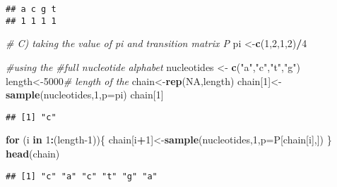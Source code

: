 \documentclass[
]{article}
\newenvironment{Shaded}{\begin{snugshade}}{\end{snugshade}}
\newcommand{\CommentTok}[1]{\textcolor[rgb]{0.56,0.35,0.01}{\textit{#1}}}
\newcommand{\ControlFlowTok}[1]{\textcolor[rgb]{0.13,0.29,0.53}{\textbf{#1}}}
\newcommand{\DataTypeTok}[1]{\textcolor[rgb]{0.13,0.29,0.53}{#1}}
\newcommand{\DecValTok}[1]{\textcolor[rgb]{0.00,0.00,0.81}{#1}}
\newcommand{\KeywordTok}[1]{\textcolor[rgb]{0.13,0.29,0.53}{\textbf{#1}}}
\newcommand{\NormalTok}[1]{#1}
\newcommand{\OperatorTok}[1]{\textcolor[rgb]{0.81,0.36,0.00}{\textbf{#1}}}
\newcommand{\OtherTok}[1]{\textcolor[rgb]{0.56,0.35,0.01}{#1}}
\newcommand{\StringTok}[1]{\textcolor[rgb]{0.31,0.60,0.02}{#1}}
\begin{document}
\begin{verbatim}
## a c g t 
## 1 1 1 1
\end{verbatim}

\begin{Shaded}
\begin{Highlighting}[]
\CommentTok{# C) taking the value of pi and transition matrix P }
\NormalTok{pi <-}\KeywordTok{c}\NormalTok{(}\DecValTok{1}\NormalTok{,}\DecValTok{2}\NormalTok{,}\DecValTok{1}\NormalTok{,}\DecValTok{2}\NormalTok{)}\OperatorTok{/}\DecValTok{4}

\CommentTok{#using the }
\CommentTok{#full nucleotide alphabet}
\NormalTok{nucleotides <-}\StringTok{ }\KeywordTok{c}\NormalTok{(}\StringTok{"a"}\NormalTok{,}\StringTok{"c"}\NormalTok{,}\StringTok{"t"}\NormalTok{,}\StringTok{"g"}\NormalTok{)}
\NormalTok{length<-}\DecValTok{5000}\CommentTok{# length of the}
\NormalTok{chain<-}\KeywordTok{rep}\NormalTok{(}\OtherTok{NA}\NormalTok{,length)}
\NormalTok{chain[}\DecValTok{1}\NormalTok{]<-}\KeywordTok{sample}\NormalTok{(nucleotides,}\DecValTok{1}\NormalTok{,}\DataTypeTok{p=}\NormalTok{pi)}
\NormalTok{chain[}\DecValTok{1}\NormalTok{]}
\end{Highlighting}
\end{Shaded}

\begin{verbatim}
## [1] "c"
\end{verbatim}

\begin{Shaded}
\begin{Highlighting}[]
\ControlFlowTok{for}\NormalTok{ (i }\ControlFlowTok{in} \DecValTok{1}\OperatorTok{:}\NormalTok{(length}\DecValTok{-1}\NormalTok{))\{ }
\NormalTok{ chain[i}\OperatorTok{+}\DecValTok{1}\NormalTok{]<-}\KeywordTok{sample}\NormalTok{(nucleotides,}\DecValTok{1}\NormalTok{,}\DataTypeTok{p=}\NormalTok{P[chain[i],])}
\NormalTok{ \}}
\KeywordTok{head}\NormalTok{(chain)}
\end{Highlighting}
\end{Shaded}

\begin{verbatim}
## [1] "c" "a" "c" "t" "g" "a"
\end{verbatim}

\begin{Shaded}
\end{Shaded}
\end{document}

